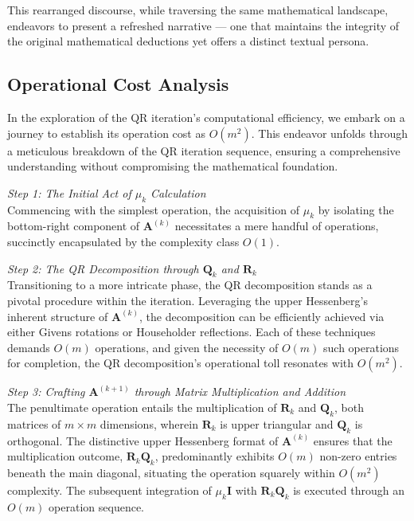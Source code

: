 \documentclass{article}
\begin{document}
This rearranged discourse, while traversing the same mathematical landscape, endeavors to present a refreshed narrative — one that maintains the integrity of the original mathematical deductions yet offers a distinct textual persona.

\subsection{Operational Cost Analysis}
In the exploration of the QR iteration's computational efficiency, we embark on a journey to establish its operation cost as $O(m^2)$. This endeavor unfolds through a meticulous breakdown of the QR iteration sequence, ensuring a comprehensive understanding without compromising the mathematical foundation.

\textit{Step 1: The Initial Act of $\mu_k$ Calculation}\\
Commencing with the simplest operation, the acquisition of $\mu_k$ by isolating the bottom-right component of $\boldsymbol{A}^{(k)}$ necessitates a mere handful of operations, succinctly encapsulated by the complexity class $O(1)$.

\textit{Step 2: The QR Decomposition through $\boldsymbol{Q}_k$ and $\boldsymbol{R}_k$}\\
Transitioning to a more intricate phase, the QR decomposition stands as a pivotal procedure within the iteration. Leveraging the upper Hessenberg's inherent structure of $\boldsymbol{A}^{(k)}$, the decomposition can be efficiently achieved via either Givens rotations or Householder reflections. Each of these techniques demands $O(m)$ operations, and given the necessity of $O(m)$ such operations for completion, the QR decomposition's operational toll resonates with $O(m^2)$.

\textit{Step 3: Crafting $\boldsymbol{A}^{(k+1)}$ through Matrix Multiplication and Addition}\\
The penultimate operation entails the multiplication of $\boldsymbol{R}_k$ and $\boldsymbol{Q}_k$, both matrices of $m \times m$ dimensions, wherein $\boldsymbol{R}_k$ is upper triangular and $\boldsymbol{Q}_k$ is orthogonal. The distinctive upper Hessenberg format of $\boldsymbol{A}^{(k)}$ ensures that the multiplication outcome, $\boldsymbol{R}_k \boldsymbol{Q}_k$, predominantly exhibits $O(m)$ non-zero entries beneath the main diagonal, situating the operation squarely within $O(m^2)$ complexity. The subsequent integration of $\mu_k \mathbf{I}$ with $\boldsymbol{R}_k \boldsymbol{Q}_k$ is executed through an $O(m)$ operation sequence.
\end{document}
